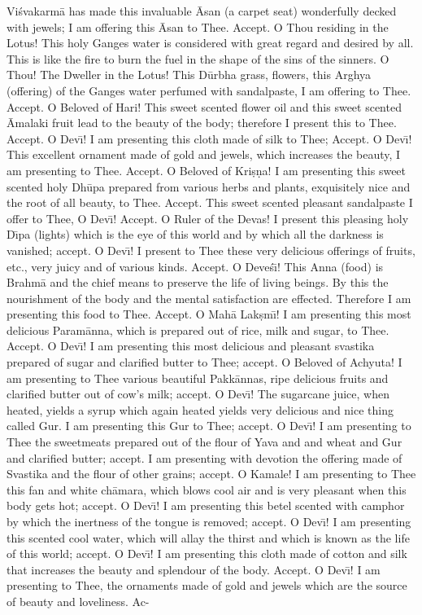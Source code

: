 Vi\'svakarm\=a has made this invaluable \=Asan (a carpet seat) wonderfully decked with jewels; I am offering this \=Asan to Thee. Accept. O Thou residing in the Lotus! This holy Ganges water is considered with great regard and desired by all. This is like the fire to burn the fuel in the shape of the sins of the sinners. O Thou! The Dweller in the Lotus! This D\=urbha grass, flowers, this Arghya (offering) of the Ganges water perfumed with sandalpaste, I am offering to Thee. Accept. O Beloved of Hari! This sweet scented flower oil and this sweet scented \=Amalaki fruit lead to the beauty of the body; therefore I present this to Thee. Accept. O Dev\={\i}! I am presenting this cloth made of silk to Thee; Accept. O Dev\={\i}! This excellent ornament made of gold and jewels, which increases the beauty, I am presenting to Thee. Accept. O Beloved of Kri\d{s}\d{n}a! I am presenting this sweet scented holy Dh\=upa prepared from various herbs and plants, exquisitely nice and the root of all beauty, to Thee. Accept. This sweet scented pleasant sandalpaste I offer to Thee, O Dev\={\i}! Accept. O Ruler of the Devas! I present this pleasing holy D\={\i}pa (lights) which is the eye of this world and by which all the darkness is vanished; accept. O Dev\={\i}! I present to Thee these very delicious offerings of fruits, etc., very juicy and of various kinds. Accept. O Deve\'s\={\i}! This Anna (food) is Brahm\=a and the chief means to preserve the life of living beings. By this the nourishment of the body and the mental satisfaction are effected. Therefore I am presenting this food to Thee. Accept. O Mah\=a Lak\d{s}m\={\i}! I am presenting this most delicious Param\=anna, which is prepared out of rice, milk and sugar, to Thee. Accept. O Dev\={\i}! I am presenting this most delicious and pleasant svastika prepared of sugar and clarified butter to Thee; accept. O Beloved of Achyuta! I am presenting to Thee various beautiful Pakk\=annas, ripe delicious fruits and clarified butter out of cow's milk; accept. O Dev\={\i}! The sugarcane juice, when heated, yields a syrup which again heated yields very delicious and nice thing called Gur. I am presenting this Gur to Thee; accept. O Dev\={\i}! I am presenting to Thee the sweetmeats prepared out of the flour of Yava and and wheat and Gur and clarified butter; accept. I am presenting with devotion the offering made of Svastika and the flour of other grains; accept. O Kamale! I am presenting to Thee this fan and white ch\=amara, which blows cool air and is very pleasant when this body gets hot; accept. O Dev\={\i}! I am presenting this betel scented with camphor by which the inertness of the tongue is removed; accept. O Dev\={\i}! I am presenting this scented cool water, which will allay the thirst and which is known as the life of this world; accept. O Dev\={\i}! I am presenting this cloth made of cotton and silk that increases the beauty and splendour of the body. Accept. O Dev\={\i}! I am presenting to Thee, the ornaments made of gold and jewels which are the source of beauty and loveliness. Ac-

